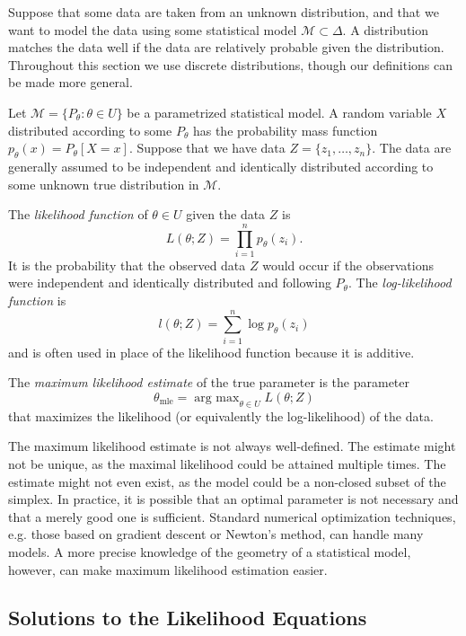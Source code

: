 \documentclass[11pt,titlepage]{article}
\newcommand*{\Mod}{\mathcal{M}}
\newcommand*{\mle}{\theta_{\text{mle}}}
\DeclareMathOperator*{\argmax}{arg\ max}
\numberwithin{equation}{section}
\begin{document}
    Suppose that some data are taken from an unknown distribution, and that we
    want to model the data using some statistical model $\Mod \subset \Delta$.
    A distribution matches the data well if the data are relatively probable
    given the distribution.  Throughout this section we use discrete
    distributions, though our definitions can be made more general.

    Let $\Mod = \{P_\theta : \theta \in U\}$ be a parametrized statistical
    model. A random variable $X$ distributed according to some $P_\theta$ has
    the probability mass function $p_\theta(x) = P_\theta[X = x]$.  Suppose that
    we have data $Z = \{z_1, \ldots, z_n\}$.  The data are generally assumed to
    be independent and identically distributed according to some unknown true
    distribution in $\Mod$.
    
    \begin{definition}
    The \emph{likelihood function} of $\theta \in U$ given the data $Z$ is
    \[
        L(\theta; Z) = \prod_{i=1}^n p_\theta(z_i).
    \]
    It is the probability that the observed data $Z$ would occur if the
    observations were independent and identically distributed and following
    $P_\theta$.  The \emph{log-likelihood function} is
    \[
        l(\theta; Z) = \sum_{i=1}^n \log p_\theta(z_i)
    \]
    and is often used in place of the likelihood function because it is additive.
    \end{definition}
    \begin{definition}
    The \emph{maximum likelihood estimate} of the true parameter is the
    parameter 
    \[
        \mle = \argmax_{\theta \in U} L(\theta; Z)
    \]
    that maximizes the likelihood (or equivalently the log-likelihood) of the
    data.
    \end{definition}

    The maximum likelihood estimate is not always well-defined.  The estimate
    might not be unique, as the maximal likelihood could be attained multiple
    times.  The estimate  might not even exist, as the model could be a
    non-closed subset of the simplex.  In practice, it is possible that an
    optimal parameter is not necessary and that a merely good one is sufficient.
    Standard numerical optimization techniques, e.g. those based on gradient
    descent or Newton's method, can handle many models.  A more precise
    knowledge of the geometry of a statistical model, however, can make maximum
    likelihood estimation easier.

\subsection{Solutions to the Likelihood Equations}
\end{document}
